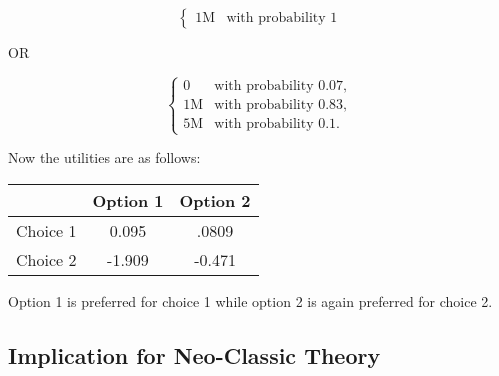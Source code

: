 \documentclass{article}
\begin{document}
\begin{equation*}
\left\{
\begin{array}{rl}
1\text{M} & \text{with probability } 1
\end{array} \right.
\end{equation*}

OR

\begin{equation*}
\left\{
\begin{array}{rl}
0 & \text{with probability } 0.07,
\\1\text{M} & \text{with probability } 0.83,
\\5\text{M} & \text{with probability } 0.1.
\end{array} \right.
\end{equation*}

Now the utilities are as follows:
\begin{center} 
\begin{tabular}{c|c c}
	& Option 1 & Option 2 \\
	\hline
	Choice 1  & 0.095 & .0809 \\
	Choice 2  &  -1.909 & -0.471 
\end{tabular}
\end{center} 
Option 1 is preferred for choice 1 while option 2 is again preferred for choice 2.  


\subsection{Implication for Neo-Classic Theory}
\end{document}
